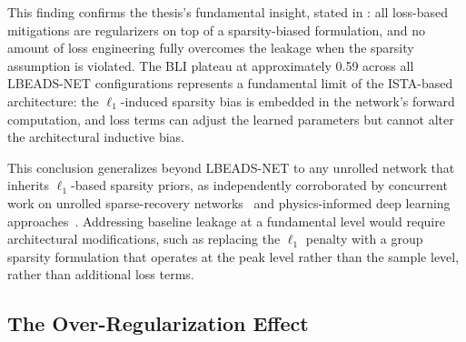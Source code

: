This finding confirms the thesis's fundamental insight, stated in : all loss-based mitigations are regularizers on top of a sparsity-biased formulation, and no amount of loss engineering fully overcomes the leakage when the sparsity assumption is violated. The BLI plateau at approximately 0.59 across all LBEADS-NET configurations represents a fundamental limit of the ISTA-based architecture: the $\ell_1$-induced sparsity bias is embedded in the network's forward computation, and loss terms can adjust the learned parameters but cannot alter the architectural inductive bias.



This conclusion generalizes beyond LBEADS-NET to any unrolled network that inherits $\ell_1$-based sparsity priors, as independently corroborated by concurrent work on unrolled sparse-recovery networks~\cite{gharbi2024unrolled} and physics-informed deep learning approaches~\cite{diras2025}. Addressing baseline leakage at a fundamental level would require architectural modifications, such as replacing the $\ell_1$ penalty with a group sparsity formulation that operates at the peak level rather than the sample level, rather than additional loss terms.


\subsection{The Over-Regularization Effect}
\label{sec:results_overreg}

